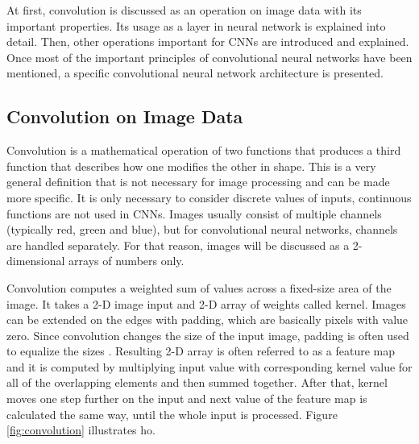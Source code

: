 At first, convolution is discussed as an operation on image data with its important properties. Its usage as a layer in neural network is explained into detail. Then, other operations important for CNNs are introduced and explained. Once most of the important principles of convolutional neural networks have been mentioned, a specific convolutional neural network architecture is presented.

\subsection{\label{sec:conv-on-image}Convolution on Image Data}

Convolution is a mathematical operation of two functions that produces a third function that describes how one modifies the other in shape. This is a very general definition that is not necessary for image processing and can be made more specific. It is only necessary to consider discrete values of inputs, continuous functions are not used in CNNs. Images usually consist of multiple channels (typically red, green and blue), but for convolutional neural networks, channels are handled separately. For that reason, images will be discussed as a 2-dimensional arrays of numbers only.

Convolution computes a weighted sum of values across a fixed-size area of the image. It takes a 2-D image input and 2-D array of weights called kernel. Images can be extended on the edges with padding, which are basically pixels with value zero. Since convolution changes the size of the input image, padding is often used to equalize the sizes \cite{dumoulin2016guide}. Resulting 2-D array is often referred to as a feature map and it is computed by multiplying input value with corresponding kernel value for all of the overlapping elements and then summed together. After that, kernel moves one step further on the input and next value of the feature map is calculated the same way, until the whole input is processed. Figure \ref{fig:convolution} illustrates ho.

